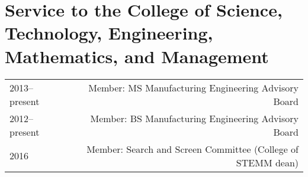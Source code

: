 \section*{Service to the College of Science, Technology, Engineering, Mathematics, and Management}
\begin{tabular}{L!{\VRule}R}
2013--present&Member: MS Manufacturing Engineering Advisory Board\\
2012--present&Member: BS Manufacturing Engineering Advisory Board\\
2016&Member: Search and Screen Committee (College of STEMM dean)\\
\end{tabular}